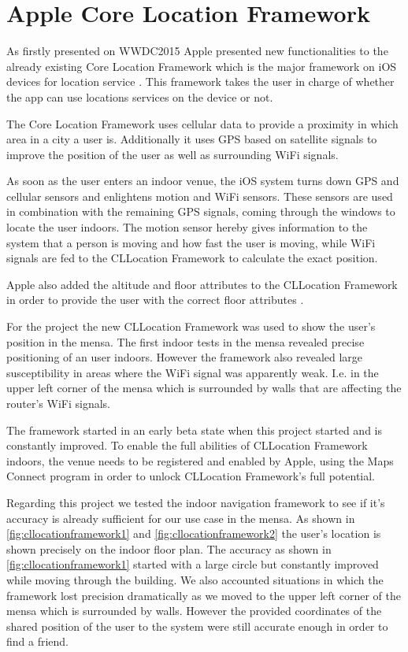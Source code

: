 \vspace{0.5cm}

\section{Apple Core Location Framework}

As firstly presented on WWDC2015 \cite{wwdc15} Apple presented new functionalities to the already existing Core Location Framework which is the major framework on iOS devices for location service \cite{CLlocation}. This framework takes the user in charge of whether the app can use locations services on the device or not.

The Core Location Framework uses cellular data to provide a proximity in which area in a city a user is. Additionally it uses GPS based on satellite signals to improve the position of the user as well as surrounding WiFi signals.

As soon as the user enters an indoor venue, the iOS system turns down GPS and cellular sensors and enlightens motion and WiFi sensors. These sensors are used in combination with the remaining GPS signals, coming through the windows to locate the user indoors. The motion sensor hereby gives information to the system that a person is moving and how fast the user is moving, while WiFi signals are fed to the CLLocation Framework to calculate the exact position.

Apple also added the altitude and floor attributes to the CLLocation Framework in order to provide the user with the correct floor attributes \cite{CLlocation}.

For the project the new CLLocation Framework was used to show the user's position in the mensa. The first indoor tests in the mensa revealed precise positioning of an user indoors. However the framework also revealed large susceptibility in areas where the WiFi signal was apparently weak. I.e. in the upper left corner of the mensa which is surrounded by walls that are affecting the router's WiFi signals.

The framework started in an early beta state when this project started and is constantly improved. To enable the full abilities of CLLocation Framework indoors, the venue needs to be registered and enabled by Apple, using the Maps Connect program \cite{MapsConnect} in order to unlock CLLocation Framework's full potential.

Regarding this project we tested the indoor navigation framework to see if it's accuracy is already sufficient for our use case in the mensa. As shown in \ref{fig:cllocationframework1} and \ref{fig:cllocationframework2} the user's location is shown precisely on the indoor floor plan. The accuracy as shown in \ref{fig:cllocationframework1} started with a large circle but constantly improved while moving through the building. We also accounted situations in which the framework lost precision dramatically as we moved to the upper left corner of the mensa which is surrounded by walls. However the provided coordinates of the shared position of the user to the system were still accurate enough in order to find a friend.

